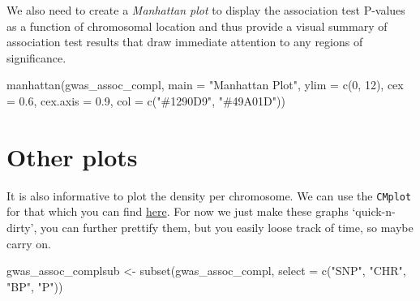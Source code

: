 \documentclass[
]{book}
\newenvironment{Shaded}{\begin{snugshade}}{\end{snugshade}}
\newcommand{\AttributeTok}[1]{\textcolor[rgb]{0.77,0.63,0.00}{#1}}
\newcommand{\DecValTok}[1]{\textcolor[rgb]{0.00,0.00,0.81}{#1}}
\newcommand{\FloatTok}[1]{\textcolor[rgb]{0.00,0.00,0.81}{#1}}
\newcommand{\FunctionTok}[1]{\textcolor[rgb]{0.00,0.00,0.00}{#1}}
\newcommand{\NormalTok}[1]{#1}
\newcommand{\OtherTok}[1]{\textcolor[rgb]{0.56,0.35,0.01}{#1}}
\newcommand{\StringTok}[1]{\textcolor[rgb]{0.31,0.60,0.02}{#1}}
\begin{document}
We also need to create a \emph{Manhattan plot} to display the association test P-values as a function of chromosomal location and thus provide a visual summary of association test results that draw immediate attention to any regions of significance.

\begin{Shaded}
\begin{Highlighting}[]
\FunctionTok{manhattan}\NormalTok{(gwas\_assoc\_compl, }\AttributeTok{main =} \StringTok{"Manhattan Plot"}\NormalTok{,}
          \AttributeTok{ylim =} \FunctionTok{c}\NormalTok{(}\DecValTok{0}\NormalTok{, }\DecValTok{12}\NormalTok{),}
          \AttributeTok{cex =} \FloatTok{0.6}\NormalTok{, }\AttributeTok{cex.axis =} \FloatTok{0.9}\NormalTok{,}
          \AttributeTok{col =} \FunctionTok{c}\NormalTok{(}\StringTok{"\#1290D9"}\NormalTok{, }\StringTok{"\#49A01D"}\NormalTok{))}
\end{Highlighting}
\end{Shaded}

\hypertarget{other-plots}{%
\section{Other plots}\label{other-plots}}

It is also informative to plot the density per chromosome. We can use the \texttt{CMplot} for that which you can find \href{https://github.com/YinLiLin/R-CMplot}{here}. For now we just make these graphs `quick-n-dirty', you can further prettify them, but you easily loose track of time, so maybe carry on.

\begin{Shaded}
\begin{Highlighting}[]
\NormalTok{gwas\_assoc\_complsub }\OtherTok{\textless{}{-}} \FunctionTok{subset}\NormalTok{(gwas\_assoc\_compl, }\AttributeTok{select =} \FunctionTok{c}\NormalTok{(}\StringTok{"SNP"}\NormalTok{, }\StringTok{"CHR"}\NormalTok{, }\StringTok{"BP"}\NormalTok{, }\StringTok{"P"}\NormalTok{))}
\end{Highlighting}
\end{Shaded}
\end{document}
